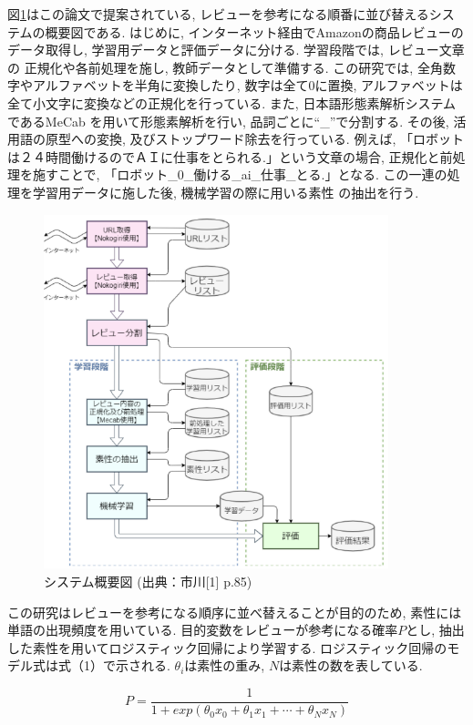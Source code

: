 \documentclass{ltjarticle}
\begin{document}
図\ref{fig:関連研究1システム概要図}はこの論文で提案されている, レビューを参考になる順番に並び替えるシステムの概要図である. はじめに, 
インターネット経由でAmazonの商品レビューのデータ取得し, 学習用データと評価データに分ける. 学習段階では, レビュー文章の
正規化や各前処理を施し, 教師データとして準備する. 
この研究では, 全角数字やアルファベットを半角に変換したり, 
数字は全て0に置換, アルファベットは全て小文字に変換などの正規化を行っている. また, 日本語形態素解析システムであるMeCab
を用いて形態素解析を行い, 品詞ごとに``\_''で分割する. その後, 活用語の原型への変換, 及びストップワード除去を行っている.
例えば, 「ロボットは２４時間働けるのでＡＩに仕事をとられる.」という文章の場合, 正規化と前処理を施すことで, 
「ロボット\_0\_働ける\_ai\_仕事\_とる.」となる. この一連の処理を学習用データに施した後, 機械学習の際に用いる素性
の抽出を行う. 
\begin{figure}[h]
    \centering
    \includegraphics[width=10cm]{images/system1.png}
    \caption{システム概要図 (出典：市川[1] p.85)}
    \label{fig:関連研究1システム概要図}
\end{figure}
この研究はレビューを参考になる順序に並べ替えることが目的のため, 素性には単語の出現頻度を用いている. 
目的変数をレビューが参考になる確率$P$とし, 抽出した素性を用いてロジスティック回帰により学習する. 
ロジスティック回帰のモデル式は式（1）で示される. $\theta_i$は素性の重み, $N$は素性の数を表している. 
\vspace{5truept}

\begin{equation}
    P=\dfrac{1}{1+exp(\theta_0x_0+\theta_1x_1+\cdots+\theta_Nx_N)}
\end{equation}
\vspace{5truept}
\end{document}
